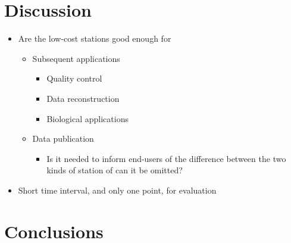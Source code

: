 \documentclass[authoryear,preprint,review,12pt]{elsarticle}
\begin{document}
\section{Discussion}
\begin{itemize}
    \item Are the low-cost stations good enough for
    \begin{itemize}
        \item Subsequent applications
        \begin{itemize}
            \item Quality control
            \item Data reconstruction
            \item Biological applications
        \end{itemize}
        \item Data publication
        \begin{itemize}
            \item Is it needed to inform end-users of the difference between the two kinds of station of can it be omitted?
        \end{itemize}
    \end{itemize}
    \item Short time interval, and only one point, for evaluation
\end{itemize}

\section{Conclusions}



   
  




\end{document}
